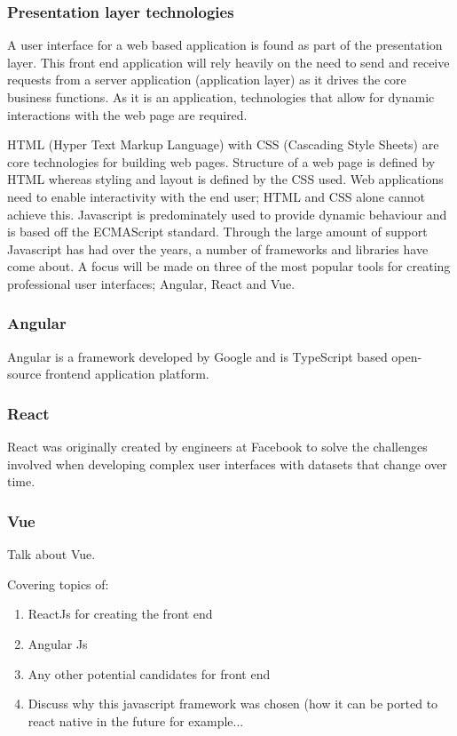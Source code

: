 \subsubsection{Presentation layer technologies}
A user interface for a web based application is found as part of the presentation layer.
This front end application will rely heavily on the need to send and receive requests from a server application (application layer) as 
it drives the core business functions.
As it is an application, technologies that allow for dynamic interactions with the web page are required.

HTML (Hyper Text Markup Language) with CSS (Cascading Style Sheets) are core technologies for building web pages\cite{w3c_html_css}.
Structure of a web page is defined by HTML whereas styling and layout is defined by the CSS used.
Web applications need to enable interactivity with the end user; HTML and CSS alone cannot achieve this.
Javascript is predominately used to provide dynamic behaviour and is based off the ECMAScript standard\cite{stefanov2010javascript}.
Through the large amount of support Javascript has had over the years, a number of frameworks and libraries have come about.
A focus will be made on three of the most popular tools for creating professional user interfaces; Angular, React and Vue\cite{stateofjs_2018}.

\subsubsection*{Angular}
Angular is a framework developed by Google and is TypeScript based open-source frontend application platform.
\subsubsection*{React} 
React was originally created by engineers at Facebook to solve the challenges involved when developing complex user interfaces with datasets 
that change over time\cite{gackenheimer2015introduction}. 
\subsubsection*{Vue}
Talk about Vue.

Covering topics of:
\begin{enumerate}
    \item ReactJs for creating the front end
    \item Angular Js 
    \item Any other potential candidates for front end
    \item Discuss why this javascript framework was chosen (how it can be ported to react native in the future for example...
\end{enumerate}

